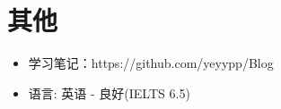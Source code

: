 \documentclass{resume}
\begin{document}
\section{其他}
\begin{itemize}[parsep=0.5ex]
  \item 学习笔记：https://github.com/yeyypp/Blog
  \item 语言: 英语 - 良好(IELTS 6.5)
\end{itemize}

%
%
\end{document}
